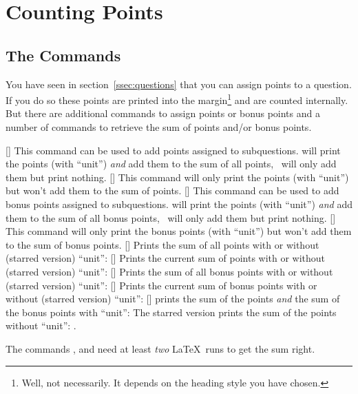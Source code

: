 \documentclass[load-preamble+]{cnltx-doc}
\begin{document}
\section{Counting Points}\label{sec:points}
\subsection{The Commands}
You have seen in section~\ref{ssec:questions} that you can assign points to a
question.  If you do so these points are printed into the
margin\footnote{Well, not necessarily.  It depends on the heading style you
  have chosen.} and are counted internally.  But there are additional commands
to assign points or bonus points and a number of commands to retrieve the sum
of points and/or bonus points.
\begin{commands}
  [\sarg{}]
    This command can be used to add points assigned to subquestions.
     will print the points (with ``unit'') \emph{and} add them
    to the sum of all points, \sarg\ will only add them but print
    nothing.
  [\sarg{}]
    This command will only print the points (with ``unit'') but won't add them
    to the sum of points.
  [\sarg{}]
    This command can be used to add bonus points assigned to subquestions.
     will print the points (with ``unit'') \emph{and} add them
    to the sum of all bonus points, \sarg\ will only add them but
    print nothing.
  [\sarg{}]
    This command will only print the bonus points (with ``unit'') but won't
    add them to the sum of bonus points.
  [\sarg]
    Prints the sum of all points with or without (starred version) ``unit'':
    \pointssum
  [\sarg]
    Prints the current sum of points with or without (starred version)
    ``unit'': \currentpointssum
  [\sarg]
    Prints the sum of all bonus points with or without (starred version)
    ``unit'': \bonussum
  [\sarg]
    Prints the current sum of bonus points with or without (starred version)
    ``unit'': \currentbonussum
  [\sarg]
    prints the sum of the points \emph{and} the sum of the bonus points with
    ``unit'': \totalpoints\space The starred version prints the sum of the
    points without ``unit'': \totalpoints*.
\end{commands}
The commands ,  and  need at
least \emph{two} \LaTeX\ runs to get the sum right.
\end{document}
